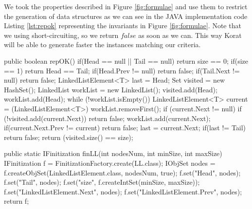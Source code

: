 \begin{code}
We took the properties described in Figure \ref{fig:formulae} and use them to restrict the generation of data structures
as we can see in the JAVA implementation code Listing \ref{lst:repok} representing the invariants in Figure \ref{fig:formulae}.
Note that we using short-circuiting, so we return $false$ as soon as we can. This way Korat will be able to generate faster the instances matching our criteria.

\begin{code}[{repOK Korat method for LinkedList class in JAVA},label=lst:repok]
public boolean repOK() {
  if(Head == null || Tail == null)
    return size == 0;
  if(size == 1) return Head == Tail;
  if(Head.Prev != null) return false;
  if(Tail.Next != null) return false;
  LinkedListElement<T> last = Head;
  Set visited = new HashSet();
  LinkedList workList = new LinkedList();
  visited.add(Head);
  workList.add(Head);
  while (!workList.isEmpty()) {
    LinkedListElement<T> current = (LinkedListElement<T>) workList.removeFirst();
    if (current.Next != null) {
      if (!visited.add(current.Next))
	    return false;
      workList.add(current.Next);
      if(current.Next.Prev != current) return false;
      last = current.Next;
    }
  }
  if(last != Tail)
    return false;
  return (visited.size() == size);
}
\end{code}

\begin{code}[{Finitization Korat method for LinkedList class in JAVA},label=lst:finit]
public static IFinitization finLL(int nodesNum, int minSize, int maxSize) {
  IFinitization f = FinitizationFactory.create(LL.class);
  IObjSet nodes = f.createObjSet(LinkedListElement.class, nodesNum, true);
  f.set("Head", nodes);
  f.set("Tail", nodes);
  f.set("size", f.createIntSet(minSize, maxSize));
  f.set("LinkedListElement.Next", nodes);
  f.set("LinkedListElement.Prev", nodes);
  return f;
}
\end{code}


\end{code}
